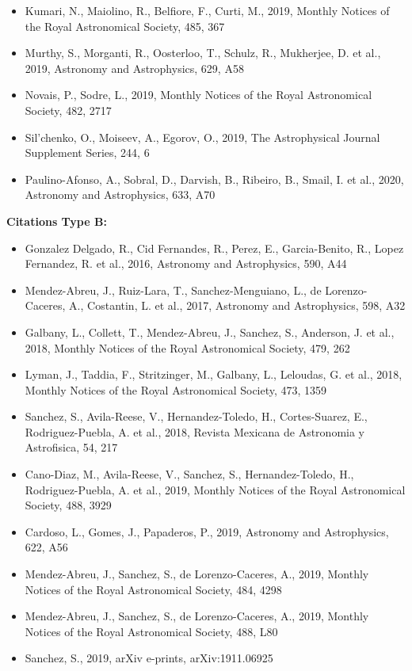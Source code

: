 \documentclass{letter}
\begin{document}
\begin{enumerate}
\begin{itemize}
\item Kumari, N., Maiolino, R., Belfiore, F., Curti, M., 2019, Monthly Notices of the Royal Astronomical Society, 485, 367
\item Murthy, S., Morganti, R., Oosterloo, T., Schulz, R., Mukherjee, D. et al., 2019, Astronomy and Astrophysics, 629, A58
\item Novais, P., Sodre, L., 2019, Monthly Notices of the Royal Astronomical Society, 482, 2717
\item Sil'chenko, O., Moiseev, A., Egorov, O., 2019, The Astrophysical Journal Supplement Series, 244, 6
\item Paulino-Afonso, A., Sobral, D., Darvish, B., Ribeiro, B., Smail, I. et al., 2020, Astronomy and Astrophysics, 633, A70
\end{itemize}
{\bf Citations Type B:}
\begin{itemize}
\item Gonzalez Delgado, R., Cid Fernandes, R., Perez, E., Garcia-Benito, R., Lopez Fernandez, R. et al., 2016, Astronomy and Astrophysics, 590, A44
\item Mendez-Abreu, J., Ruiz-Lara, T., Sanchez-Menguiano, L., de Lorenzo-Caceres, A., Costantin, L. et al., 2017, Astronomy and Astrophysics, 598, A32
\item Galbany, L., Collett, T., Mendez-Abreu, J., Sanchez, S., Anderson, J. et al., 2018, Monthly Notices of the Royal Astronomical Society, 479, 262
\item Lyman, J., Taddia, F., Stritzinger, M., Galbany, L., Leloudas, G. et al., 2018, Monthly Notices of the Royal Astronomical Society, 473, 1359
\item Sanchez, S., Avila-Reese, V., Hernandez-Toledo, H., Cortes-Suarez, E., Rodriguez-Puebla, A. et al., 2018, Revista Mexicana de Astronomia y Astrofisica, 54, 217
\item Cano-Diaz, M., Avila-Reese, V., Sanchez, S., Hernandez-Toledo, H., Rodriguez-Puebla, A. et al., 2019, Monthly Notices of the Royal Astronomical Society, 488, 3929
\item Cardoso, L., Gomes, J., Papaderos, P., 2019, Astronomy and Astrophysics, 622, A56
\item Mendez-Abreu, J., Sanchez, S., de Lorenzo-Caceres, A., 2019, Monthly Notices of the Royal Astronomical Society, 484, 4298
\item Mendez-Abreu, J., Sanchez, S., de Lorenzo-Caceres, A., 2019, Monthly Notices of the Royal Astronomical Society, 488, L80
\item Sanchez, S., 2019, arXiv e-prints, arXiv:1911.06925

\end{itemize}
\end{enumerate}
\end{document}

